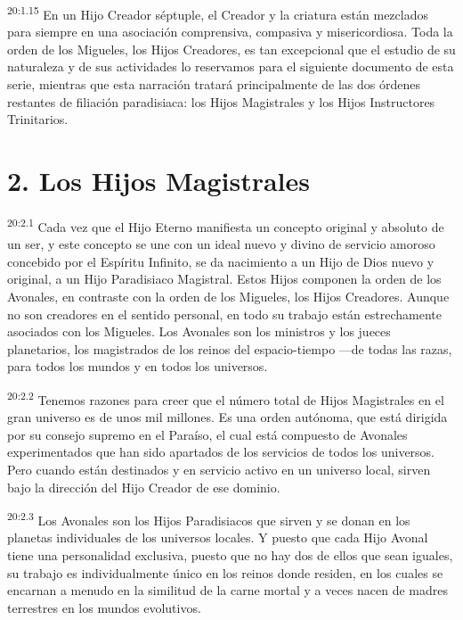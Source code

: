 \par
\textsuperscript{20:1.15} En un Hijo Creador séptuple, el Creador y la criatura están mezclados para siempre en una asociación comprensiva, compasiva y misericordiosa. Toda la orden de los Migueles, los Hijos Creadores, es tan excepcional que el estudio de su naturaleza y de sus actividades lo reservamos para el siguiente documento de esta serie, mientras que esta narración tratará principalmente de las dos órdenes restantes de filiación paradisiaca: los Hijos Magistrales y los Hijos Instructores Trinitarios.

\section*{2. Los Hijos Magistrales}
\par
\textsuperscript{20:2.1} Cada vez que el Hijo Eterno manifiesta un concepto original y absoluto de un ser, y este concepto se une con un ideal nuevo y divino de servicio amoroso concebido por el Espíritu Infinito, se da nacimiento a un Hijo de Dios nuevo y original, a un Hijo Paradisiaco Magistral. Estos Hijos componen la orden de los Avonales, en contraste con la orden de los Migueles, los Hijos Creadores. Aunque no son creadores en el sentido personal, en todo su trabajo están estrechamente asociados con los Migueles. Los Avonales son los ministros y los jueces planetarios, los magistrados de los reinos del espacio-tiempo ---de todas las razas, para todos los mundos y en todos los universos.

\par
\textsuperscript{20:2.2} Tenemos razones para creer que el número total de Hijos Magistrales en el gran universo es de unos mil millones. Es una orden autónoma, que está dirigida por su consejo supremo en el Paraíso, el cual está compuesto de Avonales experimentados que han sido apartados de los servicios de todos los universos. Pero cuando están destinados y en servicio activo en un universo local, sirven bajo la dirección del Hijo Creador de ese dominio.

\par
\textsuperscript{20:2.3} Los Avonales son los Hijos Paradisiacos que sirven y se donan en los planetas individuales de los universos locales. Y puesto que cada Hijo Avonal tiene una personalidad exclusiva, puesto que no hay dos de ellos que sean iguales, su trabajo es individualmente único en los reinos donde residen, en los cuales se encarnan a menudo en la similitud de la carne mortal y a veces nacen de madres terrestres en los mundos evolutivos.

